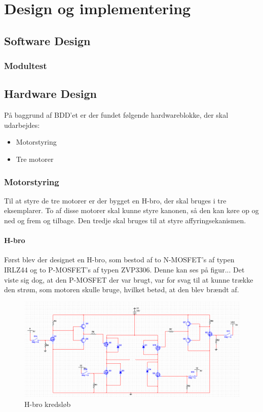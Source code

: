 \chapter{Design og implementering}


\section{Software Design}

\subsection{Modultest}



\section{Hardware Design}
På baggrund af BDD'et er der fundet følgende hardwareblokke, der skal udarbejdes: 
\begin{itemize}
	\item Motorstyring
	\item Tre motorer
\end{itemize}

\subsection{Motorstyring}
Til at styre de tre motorer er der bygget en H-bro, der skal bruges i tre eksemplarer. To af disse motorer skal kunne styre kanonen, så den kan køre op og ned og frem og tilbage. Den tredje skal bruges til at styre affyringsekanismen. 

\subsubsection{H-bro}
Først blev der designet en H-bro, som bestod af to N-MOSFET's af typen IRLZ44 og to P-MOSFET's af typen ZVP3306. Denne kan ses på figur... Det viste sig dog, at den P-MOSFET der var brugt, var for svag til at kunne trække den strøm, som motoren skulle bruge, hvilket betød, at den blev brændt af. 


\begin{figure}[H]
	\centering
	\includegraphics[]{DesignOgImplementering/images/motorkreds}
	\caption{H-bro kredsløb}
	\end{figure}

